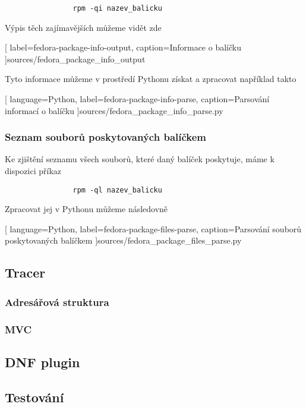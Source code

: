 \documentclass[10pt,a4paper]{article}
\begin{document}
			\begin{lstlisting}
				rpm -qi nazev_balicku
			\end{lstlisting}

			Výpis těch zajímavějších můžeme vidět zde
			
			[
				label=fedora-package-info-output,
				caption={Informace o balíčku}
			]{sources/fedora_package_info_output}

			Tyto informace můžeme v prostředí Pythonu získat a zpracovat například takto
			
			[
				language=Python,
				label=fedora-package-info-parse,
				caption={Parsování informací o balíčku}
			]{sources/fedora_package_info_parse.py}

			\subsubsection{Seznam souborů poskytovaných balíčkem}
			Ke zjištění seznamu všech souborů, které daný balíček poskytuje, máme k dispozici příkaz

			\begin{lstlisting}
				rpm -ql nazev_balicku
			\end{lstlisting}

			Zpracovat jej v Pythonu můžeme následovně

			
			[
				language=Python,
				label=fedora-package-files-parse,
				caption={Parsování souborů poskytovaných balíčkem}
			]{sources/fedora_package_files_parse.py}

		\subsection{Tracer}
			\subsubsection{Adresářová struktura}
			\subsubsection{MVC}

		\subsection{DNF plugin}
		\subsection{Testování}
\end{document}
